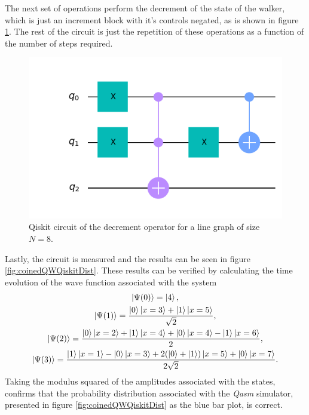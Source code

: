 \documentclass[../../dissertation.tex]{subfiles}
\begin{document}
The next set of operations perform the decrement of the state of the walker,
which is just an increment block with it's controls negated, as is shown in
figure \ref{fig:decrCircuitQistkit}. The rest of the circuit is just the
repetition of these operations as a function of the number of steps required.
\begin{figure}[!h]
	\centering
	\includegraphics[scale=0.32]{img/Qiskit/CoinedQuantumWalk/Circuits/circDecr_N3_S3.png}
	\caption{Qiskit circuit of the decrement operator for a line graph of size $N=8$.} 
	\label{fig:decrCircuitQistkit}
\end{figure}\par
Lastly, the circuit is measured and the results can be seen in figure
\ref{fig:coinedQWQiskitDist}. These results can be verified by calculating the
time evolution of the wave function associated with the system
\begin{gather}
	\ket{\Psi(0)} = \ket{4},\\
	\ket{\Psi(1)} = \frac{\ket{0}\ket{x=3}+\ket{1}\ket{x=5}}{\sqrt{2}}, \\
	\ket{\Psi(2)} = \frac{\ket{0}\ket{x=2}+\ket{1}\ket{x=4}+\ket{0}\ket{x=4}-\ket{1}\ket{x=6}}{2},\\
	\ket{\Psi(3)} = \frac{\ket{1}\ket{x=1}-\ket{0}\ket{x=3}+2(\ket{0}+\ket{1})\ket{x=5}+\ket{0}\ket{x=7}}{2\sqrt{2}}.
\end{gather}
Taking the modulus squared of the amplitudes associated with the states,
confirms that the probability distribution associated with the \textit{Qasm}
simulator, presented in figure \ref{fig:coinedQWQiskitDist} as the blue bar
plot, is correct. 
\end{document}
